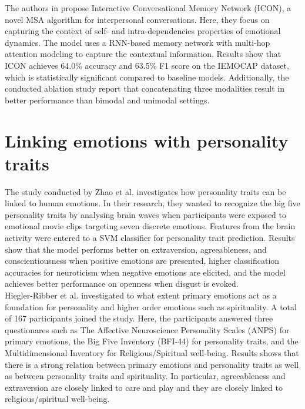 The authors in \cite{ICON_hazarika-etal-2018-icon} propose Interactive Conversational Memory Network (ICON), a novel MSA algorithm for interpersonal conversations. Here, they focus on capturing the context of self- and intra-dependencies properties of emotional dynamics. The model uses a RNN-based memory network with multi-hop attention modeling to capture the contextual information. Results show that ICON achieves 64.0\% accuracy and 63.5\% F1 score on the IEMOCAP dataset, which is statistically significant compared to baseline models. Additionally, the conducted ablation study report that concatenating three modalities result in better performance than bimodal and unimodal settings. 

\section{Linking emotions with personality traits}
The study conducted by Zhao et al. \cite{Zhao2018} investigates how personality traits can be linked to human emotions. In their research, they wanted to recognize the big five personality traits by analysing brain waves when participants were exposed to emotional movie clips targeting seven discrete emotions. Features from the brain activity were entered to a SVM classifier for personality trait prediction. Results show that the model performs better on extraversion, agreeableness, and conscientiousness when positive emotions are presented, higher classification accuracies for neuroticism when negative emotions are elicited, and the model achieves better performance on openness when disgust is evoked. \\

Hiegler-Ribber et al. \cite{personality_emotions_link} investigated to what extent primary emotions act as a foundation for personality and higher order emotions such as spirituality. A total of 167 participants joined the study. Here, the participants answered three questionares such as The Affective Neuroscience Personality Scales (ANPS) for primary emotions, the Big Five Inventory (BFI-44) for personality traits, and the Multidimensional Inventory for Religious/Spiritual well-being. Results shows that there is a strong relation between primary emotions and personality traits as well as between personality traits and spirituality. In particular, agreeableness and extraversion are closely linked to care and play and they are closely linked to religious/spiritual well-being. \\ 

